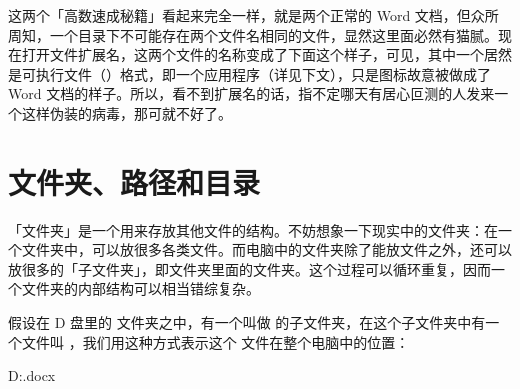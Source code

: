 这两个「高数速成秘籍」看起来完全一样，就是两个正常的 Word 文档，但众所周知，一个目录下不可能存在两个文件名相同的文件，显然这里面必然有猫腻。现在打开文件扩展名，这两个文件的名称变成了下面这个样子，可见，其中一个居然是可执行文件（）格式，即一个应用程序（详见下文），只是图标故意被做成了 Word 文档的样子。所以，看不到扩展名的话，指不定哪天有居心叵测的人发来一个这样伪装的病毒，那可就不好了。

\section{文件夹、路径和目录}

「文件夹」是一个用来存放其他文件的结构。不妨想象一下现实中的文件夹：在一个文件夹中，可以放很多各类文件。而电脑中的文件夹除了能放文件之外，还可以放很多的「子文件夹」，即文件夹里面的文件夹。这个过程可以循环重复，因而一个文件夹的内部结构可以相当错综复杂。

假设在 D 盘里的  文件夹之中，有一个叫做  的子文件夹，在这个子文件夹中有一个文件叫 ，我们用这种方式表示这个  文件在整个电脑中的位置：

\begin{MissingVerbatim}
  D:\missing{}.docx
\end{MissingVerbatim}

